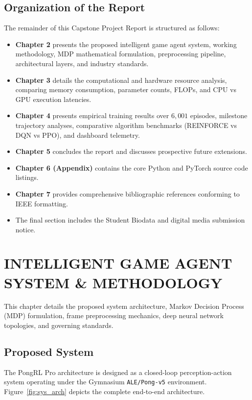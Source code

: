 \documentclass[12pt,a4paper]{report}
\begin{document}
\section{Organization of the Report}
The remainder of this Capstone Project Report is structured as follows:
\begin{itemize}
    \item \textbf{Chapter 2} presents the proposed intelligent game agent system, working methodology, MDP mathematical formulation, preprocessing pipeline, architectural layers, and industry standards.
    \item \textbf{Chapter 3} details the computational and hardware resource analysis, comparing memory consumption, parameter counts, FLOPs, and CPU vs GPU execution latencies.
    \item \textbf{Chapter 4} presents empirical training results over $6,001$ episodes, milestone trajectory analyses, comparative algorithm benchmarks (REINFORCE vs DQN vs PPO), and dashboard telemetry.
    \item \textbf{Chapter 5} concludes the report and discusses prospective future extensions.
    \item \textbf{Chapter 6 (Appendix)} contains the core Python and PyTorch source code listings.
    \item \textbf{Chapter 7} provides comprehensive bibliographic references conforming to IEEE formatting.
    \item The final section includes the Student Biodata and digital media submission notice.
\end{itemize}

\newpage
\chapter{INTELLIGENT GAME AGENT SYSTEM \& METHODOLOGY}

This chapter details the proposed system architecture, Markov Decision Process (MDP) formulation, frame preprocessing mechanics, deep neural network topologies, and governing standards.

\section{Proposed System}
The PongRL Pro architecture is designed as a closed-loop perception-action system operating under the Gymnasium \texttt{ALE/Pong-v5} environment. Figure~\ref{fig:sys_arch} depicts the complete end-to-end architecture.
\end{document}
